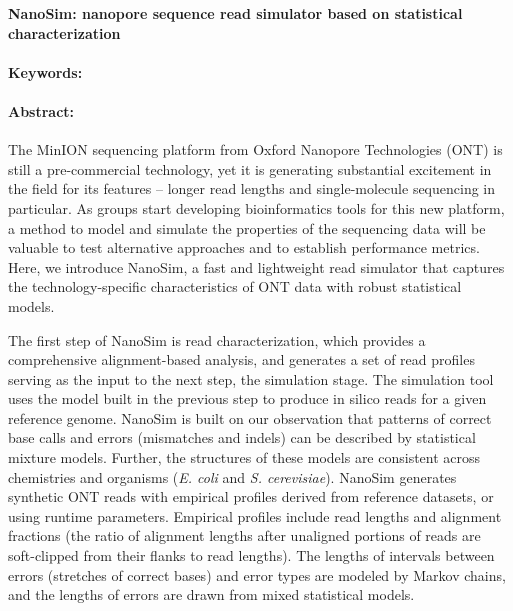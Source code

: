\noindent
\large {\bf NanoSim: nanopore sequence read simulator based on statistical characterization} 


\normalsize 


\noindent \paragraph{Keywords:} 

\noindent \paragraph{Abstract:} 

The   MinION   sequencing   platform   from   Oxford   Nanopore   Technologies   (ONT)   is   still   a  
pre-commercial  technology,  yet  it  is  generating  substantial  excitement  in  the  field  for  its  
features  –  longer  read  lengths  and  single-molecule  sequencing  in  particular.  As  groups  
start   developing   bioinformatics   tools   for   this   new   platform,   a   method   to   model   and  
simulate   the   properties   of   the   sequencing   data   will   be   valuable   to   test   alternative  
approaches  and  to  establish  performance  metrics.  Here,  we  introduce  NanoSim,  a  fast  
and   lightweight   read   simulator   that   captures   the   technology-specific   characteristics   of  
ONT  data  with  robust  statistical  models.  

The   first   step   of   NanoSim   is   read   characterization,   which   provides   a   comprehensive  
alignment-­based   analysis,   and   generates   a   set   of   read   profiles   serving   as   the   input   to  
the   next   step,   the   simulation   stage.   The   simulation   tool   uses   the   model   built   in   the  
previous  step  to  produce  in  silico  reads  for  a  given  reference  genome.  NanoSim  is  built  
on   our   observation   that   patterns   of   correct   base   calls   and   errors   (mismatches   and  
indels)  can  be  described  by  statistical  mixture  models.  Further,  the  structures  of  these  
models   are   consistent   across   chemistries   and   organisms   ({\it E.   coli}   and   {\it S.   cerevisiae}).  
NanoSim  generates  synthetic  ONT  reads  with  empirical  profiles  derived  from  reference  
datasets,   or   using   runtime   parameters.   Empirical   profiles   include   read   lengths   and  
alignment  fractions  (the  ratio  of  alignment  lengths  after  unaligned  portions  of  reads  are  
soft-­clipped   from   their   flanks   to   read   lengths).   The   lengths   of   intervals   between   errors  
(stretches   of   correct   bases)   and   error   types   are   modeled   by   Markov   chains,   and   the  
lengths  of  errors  are  drawn  from  mixed  statistical  models.  



